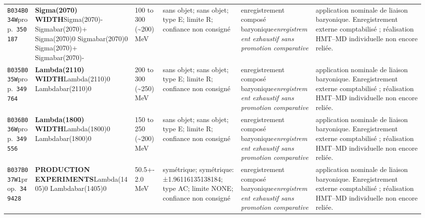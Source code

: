 \begin{landscape}
\begin{longtable}{L{1.85cm}L{4.45cm}L{2.35cm}L{4.05cm}L{3.35cm}L{7.15cm}}
\texttt{B034}\newline \texttt{B034W}\newline prop.\ \texttt{350187} & \textbf{Sigma(2070) WIDTH}\newline Sigma(2070)- \textbar{}\allowbreak{} Sigmabar(2070)+ \textbar{}\allowbreak{} Sigma(2070)0 \textbar{}\allowbreak{} Sigmabar(2070)0 \textbar{}\allowbreak{} Sigma(2070)+ \textbar{}\allowbreak{} Sigmabar(2070)- & 100 to 300 (\textasciitilde{}200)\,MeV & sans objet; sans objet; type E; limite R; confiance non consigné & enregistrement composé baryonique\newline \emph{enregistrement exhaustif sans promotion comparative} & application nominale de liaison baryonique. Enregistrement externe comptabilisé ; réalisation HMT--MD individuelle non encore reliée. \\
\texttt{B035}\newline \texttt{B035W}\newline prop.\ \texttt{349764} & \textbf{Lambda(2110) WIDTH}\newline Lambda(2110)0 \textbar{}\allowbreak{} Lambdabar(2110)0 & 200 to 300 (\textasciitilde{}250)\,MeV & sans objet; sans objet; type E; limite R; confiance non consigné & enregistrement composé baryonique\newline \emph{enregistrement exhaustif sans promotion comparative} & application nominale de liaison baryonique. Enregistrement externe comptabilisé ; réalisation HMT--MD individuelle non encore reliée. \\
\texttt{B036}\newline \texttt{B036W}\newline prop.\ \texttt{349556} & \textbf{Lambda(1800) WIDTH}\newline Lambda(1800)0 \textbar{}\allowbreak{} Lambdabar(1800)0 & 150 to 250 (\textasciitilde{}200)\,MeV & sans objet; sans objet; type E; limite R; confiance non consigné & enregistrement composé baryonique\newline \emph{enregistrement exhaustif sans promotion comparative} & application nominale de liaison baryonique. Enregistrement externe comptabilisé ; réalisation HMT--MD individuelle non encore reliée. \\
\texttt{B037}\newline \texttt{B037W1}\newline prop.\ \texttt{349428} & \textbf{PRODUCTION EXPERIMENTS}\newline Lambda(1405)0 \textbar{}\allowbreak{} Lambdabar(1405)0 & 50.5+-2.0\,MeV & symétrique; symétrique: ±1.96116135138184; type AC; limite NONE; confiance non consigné & enregistrement composé baryonique\newline \emph{enregistrement exhaustif sans promotion comparative} & application nominale de liaison baryonique. Enregistrement externe comptabilisé ; réalisation HMT--MD individuelle non encore reliée. \\

\end{longtable}
\end{landscape}
